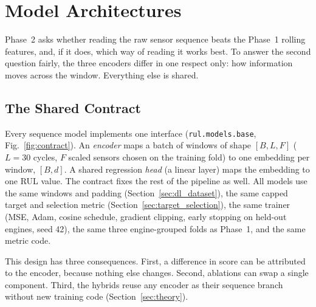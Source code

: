 
\section{Model Architectures}
\label{sec:architecture}

Phase~2 asks whether reading the raw sensor sequence beats the Phase~1
rolling features, and, if it does, which way of reading it works best. To
answer the second question fairly, the three encoders differ in one respect
only: how information moves across the window. Everything else is shared.

\subsection{The Shared Contract}
Every sequence model implements one interface
(\texttt{rul.models.base}, Fig.~\ref{fig:contract}). An \emph{encoder} maps
a batch of windows of shape $[B,L,F]$ ($L=30$ cycles, $F$ scaled sensors
chosen on the training fold) to one embedding per window, $[B,d]$. A shared
regression \emph{head} (a linear layer) maps the embedding to one RUL value.
The contract fixes the rest of the pipeline as well. All models use the same
windows and padding (Section~\ref{sec:dl_dataset}), the same capped target and
selection metric (Section~\ref{sec:target_selection}), the same trainer (MSE,
Adam, cosine schedule, gradient clipping, early stopping on held-out engines,
seed 42), the same three engine-grouped folds as Phase~1, and the same metric
code.

This design has three consequences. First, a difference in score can be
attributed to the encoder, because nothing else changes. Second, ablations
can swap a single component. Third, the hybrids reuse any encoder as their
sequence branch without new training code (Section~\ref{sec:theory}).

